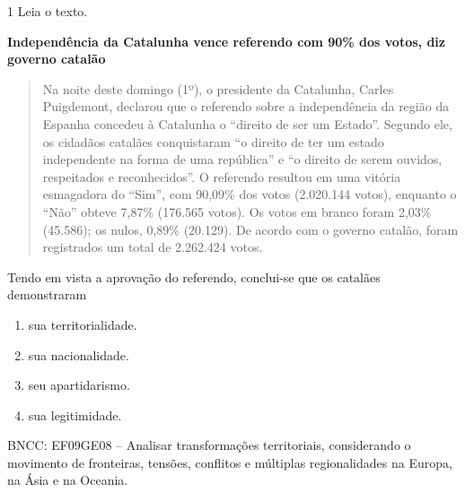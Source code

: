 

\num{1} Leia o texto.

\textbf{Independência da Catalunha vence referendo com 90\% dos votos, diz governo catalão}

\begin{quote}
Na noite deste domingo (1º), o presidente da Catalunha, Carles
Puigdemont, declarou que o referendo sobre a independência da região da
Espanha concedeu à Catalunha o ``direito de ser um Estado''. Segundo
ele, os cidadãos catalães conquistaram ``o direito de ter um estado
independente na forma de uma república'' e ``o direito de serem ouvidos,
respeitados e reconhecidos''. O referendo resultou em uma vitória
esmagadora do ``Sim'', com 90,09\% dos votos (2.020.144 votos), enquanto
o ``Não'' obteve 7,87\% (176.565 votos). Os votos em branco foram 2,03\%
(45.586); os nulos, 0,89\% (20.129). De acordo com o governo catalão,
foram registrados um total de 2.262.424 votos.
\end{quote}


Tendo em vista a aprovação do referendo, conclui-se que os catalães
demonstraram

\begin{enumerate}
\def\labelenumi{\alph{enumi})}
\item
  sua territorialidade.
\item
  sua nacionalidade.
\item
  seu apartidarismo.
\item
  sua legitimidade.
\end{enumerate}

BNCC: EF09GE08 -- Analisar transformações territoriais, considerando o
movimento de fronteiras, tensões, conflitos e múltiplas regionalidades
na Europa, na Ásia e na Oceania.

